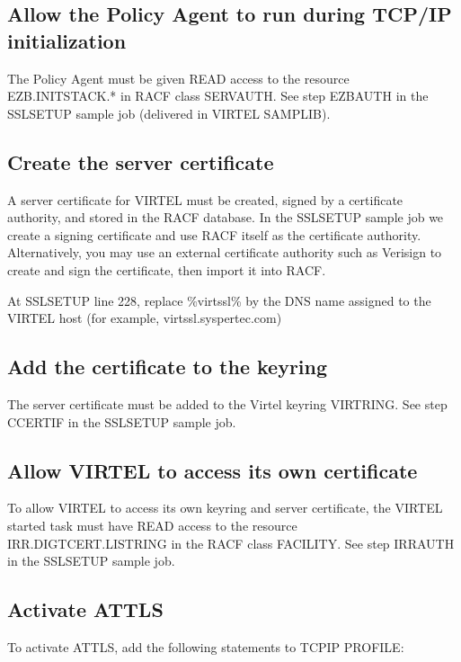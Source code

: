 \documentclass[letterpaper,10pt,english]{sphinxmanual}
\begin{document}
\subsection{Allow the Policy Agent to run during TCP/IP initialization}
\label{\detokenize{connectivity_guide:allow-the-policy-agent-to-run-during-tcp-ip-initialization}}
\sphinxAtStartPar
The Policy Agent must be given READ access to the resource EZB.INITSTACK.* in RACF class SERVAUTH. See step EZBAUTH in the SSLSETUP sample job (delivered in VIRTEL SAMPLIB).


\subsection{Create the server certificate}
\label{\detokenize{connectivity_guide:create-the-server-certificate}}
\sphinxAtStartPar
A server certificate for VIRTEL must be created, signed by a certificate authority, and stored in the RACF database. In the SSLSETUP sample job we create a signing certificate and use RACF itself as the certificate authority. Alternatively, you may use an external certificate authority such as Verisign to create and sign the certificate, then import it into RACF.

\sphinxAtStartPar
At SSLSETUP line 228, replace \%virtssl\% by the DNS name assigned to the VIRTEL host (for example, virtssl.syspertec.com)


\subsection{Add the certificate to the keyring}
\label{\detokenize{connectivity_guide:add-the-certificate-to-the-keyring}}
\sphinxAtStartPar
The server certificate must be added to the Virtel keyring \sphinxhyphen{} VIRTRING. See step CCERTIF in the SSLSETUP sample job.


\subsection{Allow VIRTEL to access its own certificate}
\label{\detokenize{connectivity_guide:allow-virtel-to-access-its-own-certificate}}
\sphinxAtStartPar
To allow VIRTEL to access its own keyring and server certificate, the VIRTEL started task must have READ access to the resource IRR.DIGTCERT.LISTRING in the RACF class FACILITY. See step IRRAUTH in the SSLSETUP sample job.


\subsection{Activate AT\sphinxhyphen{}TLS}
\label{\detokenize{connectivity_guide:activate-at-tls}}
\sphinxAtStartPar
To activate AT\sphinxhyphen{}TLS, add the following statements to TCPIP PROFILE:
\end{document}
